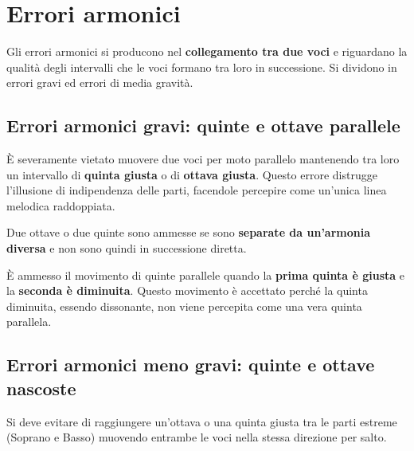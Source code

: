 \section{Errori armonici}
\label{sec:errori_armonici}

Gli errori armonici si producono nel \textbf{collegamento tra due voci} e riguardano la qualità degli intervalli che le voci formano tra loro in successione. Si dividono in errori gravi ed errori di media gravità.

\subsection{Errori armonici gravi: quinte e ottave parallele}

\begin{errore}
	\label{err:quinte_ottave_parallele}
	È severamente vietato muovere due voci per moto parallelo mantenendo tra loro un intervallo di \textbf{quinta giusta} o di \textbf{ottava giusta}. Questo errore distrugge l'illusione di indipendenza delle parti, facendole percepire come un'unica linea melodica raddoppiata.
\end{errore}

Due ottave o due quinte sono ammesse se sono \textbf{separate da un'armonia diversa} e non sono quindi in successione diretta.

\begin{regola}
	\label{reg:quinte_g_dim}
	È ammesso il movimento di quinte parallele quando la \textbf{prima quinta è giusta} e la \textbf{seconda è diminuita}. Questo movimento è accettato perché la quinta diminuita, essendo dissonante, non viene percepita come una vera quinta parallela.
\end{regola}

\subsection{Errori armonici meno gravi: quinte e ottave nascoste}

\begin{errore}
	\label{err:quinte_nascoste}
	Si deve evitare di raggiungere un'ottava o una quinta giusta tra le parti estreme (Soprano e Basso) muovendo entrambe le voci nella stessa direzione per salto.
\end{errore}

